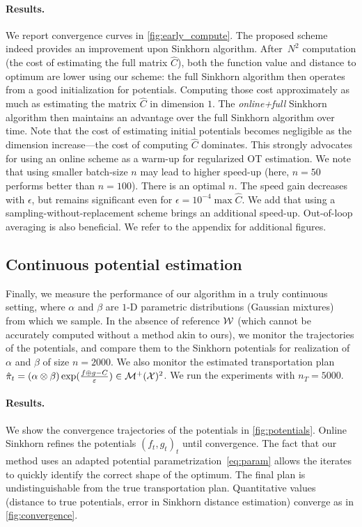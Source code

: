 \paragraph{Results.} We report convergence curves in
\autoref{fig:early_compute}. The proposed scheme indeed provides an improvement
upon Sinkhorn algorithm. After $N^2$ computation (the cost of estimating the
full matrix $\hat C$), both the function value and distance to optimum are lower
using our scheme: the full Sinkhorn algorithm then operates from a good
initialization for potentials. Computing those cost approximately as much as
estimating the matrix $\hat C$ in dimension $1$. The \textit{online+full}
Sinkhorn algorithm then maintains an advantage over the full Sinkhorn algorithm
over time. Note that the cost of estimating initial potentials becomes negligible
as the dimension increase---the cost of computing $\hat C$ dominates. This
strongly advocates for using an online scheme as a warm-up for regularized OT
estimation. We note that using smaller batch-size $n$ may lead to higher speed-up (here, $n=50$ performs better than $n=100$).
There is an optimal $n$. The speed gain decreases with $\epsilon$, but remains
significant even for $\epsilon = 10^{-4} \max \hat C$. We add that
using a sampling-without-replacement scheme brings an additional speed-up. Out-of-loop averaging is also beneficial. We refer to the appendix for additional figures.

\subsection{Continuous potential estimation}

Finally, we measure the performance of our algorithm in a truly continuous
setting, where $\alpha$ and $\beta$ are $1$-D parametric distributions (Gaussian
mixtures) from which we sample. In the absence of reference $\mathcal{W}$ (which cannot be accurately computed
without a method akin to ours), we monitor the
trajectories of the potentials, and compare them to the Sinkhorn potentials for
realization of $\alpha$ and $\beta$ of size $n=2000$. We also monitor the
estimated transportation plan $\hat \pi_t = (\alpha \otimes \beta)
\exp(\frac{f\oplus g - C}{\varepsilon}) \in \mathcal{M}^+(\mathcal{X})^2$. We run the experiments with
$n_T=5000$.

\paragraph{Results.} We show the convergence trajectories of the potentials in
\autoref{fig:potentials}. Online Sinkhorn refines the potentials $(f_t, g_t)_t$ until convergence. The fact that our method uses an adapted potential parametrization~\eqref{eq:param}
allows the iterates to quickly identify the correct shape of the optimum. The
final plan is undistinguishable from the true transportation plan. Quantitative
values (distance to true potentials, error in Sinkhorn distance estimation) converge as in
\autoref{fig:convergence}.

